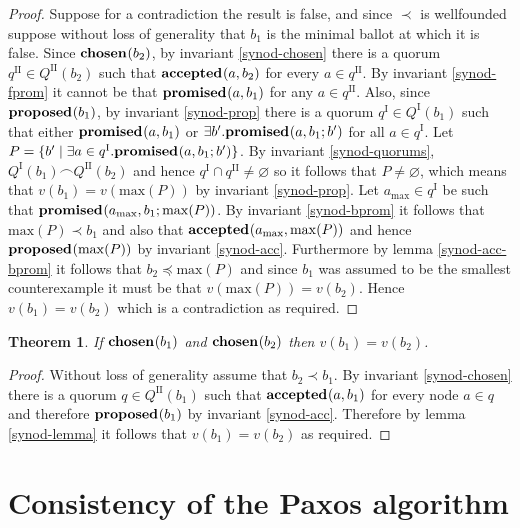 \documentclass[journal]{IEEEtran}
\newtheorem{theorem}{Theorem}
\begin{document}
\begin{proof}Suppose for a contradiction the result is false, and since $\prec$
is wellfounded suppose without loss of generality that $b_1$ is the minimal
ballot at which it is false.  Since $\mathbf{chosen}_{}(b_2)$, by invariant
\ref{synod-chosen} there is a quorum $q^\textrm{II} \in Q^\textrm{II}(b_2)$
such that $\mathbf{accepted}_{}(a,b_2)$ for every $a \in q^\textrm{II}$.  By invariant
\ref{synod-fprom} it cannot be that $\mathbf{promised}_{}(a,b_1)$ for any $a \in
q^\textrm{II}$.  Also, since $\mathbf{proposed}_{}(b_1)$, by invariant \ref{synod-prop}
there is a quorum $q^\textrm{I} \in Q^\textrm{I}(b_1)$ such that either
$\mathbf{promised}_{}(a,b_1)$ or $\exists b'.  \mathbf{promised}_{}(a,b_1;b')$ for all $a \in
q^\textrm{I}$.  Let $P = \{ b' \mid \exists a \in q^\textrm{I}.
\mathbf{promised}_{}(a,b_1;b') \}$.  By invariant \ref{synod-quorums},
${Q^\textrm{I}(b_1) \frown Q^\textrm{II}(b_2)}$ and hence $q^\textrm{I} \cap
q^\textrm{II} \ne \varnothing$ so it follows that $P \ne \varnothing$, which
means that $v(b_1) = v(\mathrm{max}(P))$ by invariant \ref{synod-prop}. Let
$a_{\mathrm{max}} \in q^\textrm{I}$ be such that
$\mathbf{promised}_{}(a_{\mathrm{max}},b_1;\mathrm{max}(P))$.  By invariant
\ref{synod-bprom} it follows that $\mathrm{max}(P) \prec b_1$ and also that
$\mathbf{accepted}_{}(a_{\mathrm{max}},\mathrm{max}(P))$ and hence
$\mathbf{proposed}_{}(\mathrm{max}(P))$ by invariant \ref{synod-acc}. Furthermore by lemma
\ref{synod-acc-bprom} it follows that $b_2 \preceq \mathrm{max}(P)$ and since
$b_1$ was assumed to be the smallest counterexample it must be that
$v(\mathrm{max}(P)) = v(b_2)$.  Hence $v(b_1) = v(b_2)$ which is a
contradiction as required.  \end{proof}

\begin{theorem}\label{synod-safety-theorem} If $\mathbf{chosen}_{}(b_1)$ and
$\mathbf{chosen}_{}(b_2)$ then $v(b_1) = v(b_2)$.  \end{theorem}

\begin{proof} Without loss of generality assume that ${b_2 \prec b_1}$. By
invariant \ref{synod-chosen} there is a quorum $q \in Q^\textrm{II}(b_1)$ such
that $\mathbf{accepted}_{}(a,b_1)$ for every node $a \in q$ and therefore $\mathbf{proposed}_{}(b_1)$ by
invariant \ref{synod-acc}.  Therefore by lemma \ref{synod-lemma} it follows
that $v(b_1) = v(b_2)$ as required.  \end{proof}

\section{Consistency of the Paxos algorithm}\label{paxos-invariants}
\end{document}
